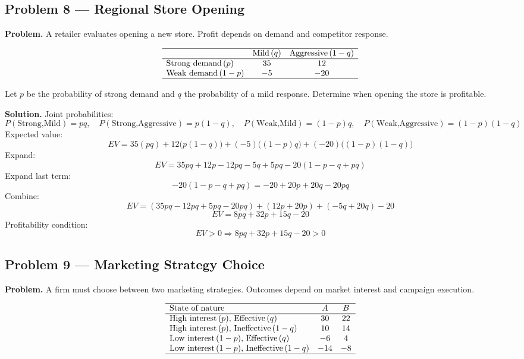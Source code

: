 \begin{ExamProblems}
		
		\hypertarget{c7-ex8}{}
		\item
		\subsection*{Problem 8 — Regional Store Opening}
		
		\textbf{Problem.}
		A retailer evaluates opening a new store. Profit depends on demand and competitor response.
		
		\[
		\begin{array}{lcc}
			\hline
			& \text{Mild}\,(q) & \text{Aggressive}\,(1-q) \\
			\hline
			\text{Strong demand}\,(p) & 35 & 12 \\
			\text{Weak demand}\,(1-p) & -5 & -20 \\
			\hline
		\end{array}
		\]
		
		Let \(p\) be the probability of strong demand and \(q\) the probability of a mild response.  
		Determine when opening the store is profitable.
		
		\textbf{Solution.}
		Joint probabilities:
		\[
		P(\text{Strong,Mild})=pq,\quad
		P(\text{Strong,Aggressive})=p(1-q),\quad
		P(\text{Weak,Mild})=(1-p)q,\quad
		P(\text{Weak,Aggressive})=(1-p)(1-q)
		\]
		Expected value:
		\[
		EV=35(pq)+12\bigl(p(1-q)\bigr)+(-5)\bigl((1-p)q\bigr)+(-20)\bigl((1-p)(1-q)\bigr)
		\]
		Expand:
		\[
		EV=35pq + 12p - 12pq - 5q + 5pq - 20(1-p-q+pq)
		\]
		Expand last term:
		\[
		-20(1-p-q+pq)=-20 + 20p + 20q - 20pq
		\]
		Combine:
		\[
		EV=(35pq-12pq+5pq-20pq) + (12p+20p) + (-5q+20q) - 20
		\]
		\[
		EV=8pq + 32p + 15q - 20
		\]
		Profitability condition:
		\[
		EV>0 \Rightarrow 8pq+32p+15q-20>0
		\]
		
		
		\hypertarget{c7-ex9}{}
		\item
		\subsection*{Problem 9 — Marketing Strategy Choice}
		
		\textbf{Problem.}
		A firm must choose between two marketing strategies. Outcomes depend on market interest
		and campaign execution.
		
		\[
		\begin{array}{lcc}
			\hline
			\text{State of nature} & A & B \\
			\hline
			\text{High interest}\,(p),\,\text{Effective}\,(q) & 30 & 22 \\
			\text{High interest}\,(p),\,\text{Ineffective}\,(1-q) & 10 & 14 \\
			\text{Low interest}\,(1-p),\,\text{Effective}\,(q) & -6 & 4 \\
			\text{Low interest}\,(1-p),\,\text{Ineffective}\,(1-q) & -14 & -8 \\
			\hline
		\end{array}
		\]
		

\end{ExamProblems}
